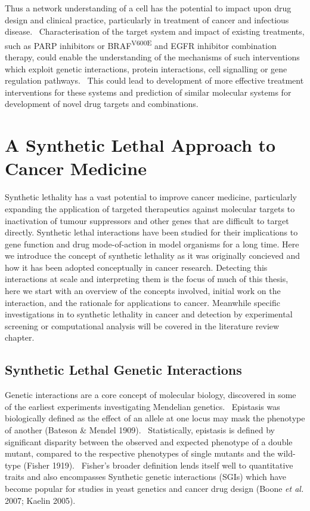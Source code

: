 Thus a network understanding of a cell has the potential to impact upon drug design and clinical practice, particularly in treatment of cancer and infectious disease. \ Characterisation of the target system and impact of existing treatments, such as PARP inhibitors or BRAF\textsuperscript{V600E} and EGFR inhibitor combination therapy, could enable the understanding of the mechanisms of such interventions which exploit genetic interactions, protein interactions, cell signalling or gene regulation pathways. \ This could lead to development of more effective treatment interventions for these systems and prediction of similar molecular systems for development of novel drug targets and combinations. \  



\section{A Synthetic Lethal Approach to Cancer Medicine}

Synthetic lethality has a vast potential to improve cancer medicine, particularly expanding the application of targeted therapeutics against molecular targets to inactivation of tumour suppressors and other genes that are difficult to target directly. Synthetic lethal interactions have been studied for their implications to gene function and drug mode-of-action in model organisms for a long time. Here we introduce the concept of synthetic lethality as it was originally concieved and how it has been adopted conceptually in cancer research. Detecting this interactions at scale and interpreting them is the focus of much of this thesis, here we start with an overview of the concepts involved, initial work on the interaction, and the rationale for applications to cancer. Meanwhile specific investigations in to synthetic lethality in cancer and detection by experimental screening or computational analysis will be covered in the literature review chapter.


\subsection{Synthetic Lethal Genetic Interactions}
Genetic interactions are a core concept of molecular biology, discovered in some of the earliest experiments investigating Mendelian genetics. \ Epistasis was biologically defined as the effect of an allele at one locus may mask the phenotype of another (Bateson \& Mendel 1909). \ Statistically, epistasis is defined by significant disparity between the observed and expected phenotype of a double mutant, compared to the respective phenotypes of single mutants and the wild-type (Fisher 1919). \ Fisher{\textquoteright}s broader definition lends itself well to quantitative traits and also encompasses Synthetic genetic interactions (SGIs) which have become popular for studies in yeast genetics and cancer drug design (Boone\textit{ et al.} 2007; Kaelin 2005). \ 


